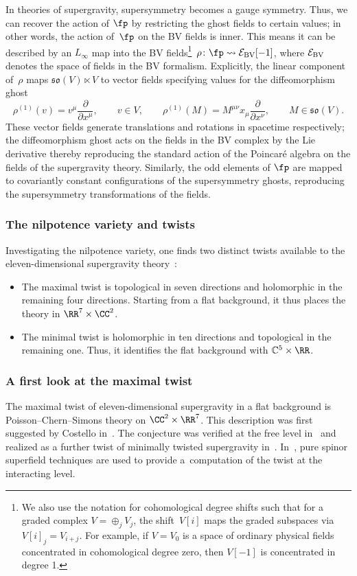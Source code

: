 \documentclass[pdftex]{sigma}
\numberwithin{equation}{section}
\theoremstyle{definition}
\def\C{\mathbb{C}}
\def\lie#1{\ensuremath{\mathfrak{#1}}}
\def\so{\lie{so}}
\begin{document}
In theories of supergravity, supersymmetry becomes a gauge symmetry. Thus, we can recover the action of $\fp$ by restricting the ghost fields to certain values; in other words, the action of~$\fp$ on the BV fields is inner.
This means it can be described by an $L_\infty$ map into the BV fields\footnote{We also use the notation for cohomological degree shifts such that for a graded complex $V = \oplus_j V_j$, the shift~$V[i]$ maps the graded subspaces via $V[i]_j = V_{i + j}$. For example, if $V = V_0$ is a space of ordinary physical fields concentrated in cohomological degree zero, then $V[-1]$ is concentrated in degree 1.}~${
 \rho \colon \fp \rightsquigarrow \mathcal{E}_{\rm BV} [-1]}$,
where $\mathcal{E}_{\rm BV}$ denotes the space of fields in the BV formalism.
Explicitly, the linear component of~$\rho$ maps $\so(V) \ltimes V$ to vector fields specifying values for the diffeomorphism ghost
\[
 \rho^{(1)}(v) = v^\mu \frac{\partial}{\partial x^\mu}, \qquad v \in V ,\qquad
 \rho^{(1)}(M) = M^{\mu \nu} x_\mu \frac{\partial}{\partial x^\nu} ,\qquad M \in \so(V).
\]
These vector fields generate translations and rotations in spacetime respectively; the diffeomorphism ghost acts on the fields in the BV complex by the Lie derivative thereby reproducing the standard action of the Poincar\'e algebra on the fields of the supergravity theory. Similarly, the odd elements of $\fp$ are mapped to covariantly constant configurations of the supersymmetry ghosts, reproducing the supersymmetry transformations of the fields.

\subsubsection{The nilpotence variety and twists}
Investigating the nilpotence variety, one finds two distinct twists available to the eleven-dimen\-sion\-al supergravity theory~\cite{NV}:
\begin{itemize}\itemsep=0pt
 \item[--] The maximal twist is topological in seven directions and holomorphic in the remaining four directions. Starting from a flat background, it thus places the theory in $\RR^7 \times \CC^2$.
 \item[--] The minimal twist is holomorphic in ten directions and topological in the remaining one. Thus, it identifies the flat background with $\C^5 \times \RR$.
\end{itemize}

\subsubsection{A first look at the maximal twist}\label{p: first-max}
The maximal twist of eleven-dimensional supergravity in a flat background is Poisson--Chern--Simons theory on $\CC^2 \times \RR^7$. This description was first suggested by Costello in~\cite{CostelloMtheory2}. The conjecture was verified at the free level in~\cite{MaxTwist} and realized as a further twist of minimally twisted supergravity in~\cite{RSW}. In~\cite{CY2}, pure spinor superfield techniques are used to provide a~computation of the twist at the interacting level.
\end{document}
